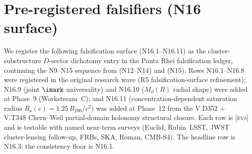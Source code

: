 \documentclass{pantarhei-researchnote}
\newcommand{\Mpa}{M_{\partial}}                 %
\newcommand{\Rtwohun}{R_{200}}
\newcommand{\evstag}{\textsc{[evs]}}
\newcommand{\falsifierID}[1]{\textsc{N16.#1}}
\begin{document}
\section{Pre-registered falsifiers (N16 surface)}\label{sec:falsifiers}

We register the following falsification surface (\falsifierID{1}--\falsifierID{11})
as the cluster-substructure $D$-sector dichotomy entry in the Panta Rhei
falsification ledger, continuing the N9--N15 sequence from
\cite{KSZCategorical} (N12--N14) and \cite{LRDCategoricalv33} (N15).
Rows \falsifierID{1}--\falsifierID{8} were registered in the original
research wave (R5 falsification-surface refinement); \falsifierID{9}
(joint $\imark$ universality) and \falsifierID{10} ($\Mpa(R)$ radial
shape) were added at Phase~9 (Workstream~C); and \falsifierID{11}
(concentration-dependent saturation radius $R_\star(c) = 1.25\,\Rtwohun/c^2$)
was added at Phase~12 from the V.D352 + V.T348 Chern--Weil partial-domain
holonomy structural closure.
Each row is \evstag{} and is testable with named near-term surveys
(Euclid, Rubin~LSST, JWST cluster-lensing follow-up, FRBs, SKA, Roman,
CMB-S4). The headline row is \falsifierID{3}; the consistency floor is
\falsifierID{1}.
\end{document}
